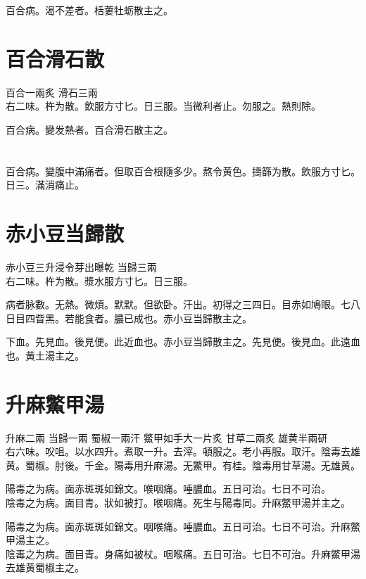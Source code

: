 百合病。渴不差者。栝蔞牡蛎散主之。

\section{百合滑石散}

百合{\scriptsize 一兩炙} 滑石{\scriptsize 三兩}\\
右二味。杵为散。飲服方寸匕。日三服。当微利者止。勿服之。熱則除。

百合病。變发熱者。百合滑石散主之。

\section{}

百合病。變腹中滿痛者。但取百合根隨多少。熬令黄色。擣篩为散。飲服方寸匕。日三。滿消痛止。

\section{赤小豆当歸散}

赤小豆{\scriptsize 三升浸令芽出曝乾} 当歸{\scriptsize 三兩}\\
右二味。杵为散。漿水服方寸匕。日三服。

病者脉數。无熱。微煩。默默。但欲卧。汗出。初得之三四日。目赤如鳩眼。七八日目四眥黑。若能食者。膿已成也。赤{\khaaitp 小}豆当歸散主之。

下血。先見血。後見便。此近血也。赤小豆当歸散主之。先見便。後見血。此遠血也。黄土湯主之。

\section{升麻鱉甲湯}

升麻{\scriptsize 二兩} 当歸{\scriptsize 一兩} 蜀椒{\scriptsize 一兩汗} 鱉甲{\scriptsize 如手大一片炙} 甘草{\scriptsize 二兩炙} 雄黄{\scriptsize 半兩研}\\
右六味。㕮咀。以水四升。煮取一升。去滓。頓服之。老小再服。取汗。陰毒去雄黄。蜀椒。{\scriptsize 肘後。千金。陽毒用升麻湯。无鱉甲。有桂。陰毒用甘草湯。无雄黄。}

陽毒之为病。面赤斑斑如錦文。喉咽痛。唾膿血。五日可治。七日不可治。\\
陰毒之为病。面目青。狀如被打。喉咽痛。死生与陽毒同。升麻鱉甲湯并主之。{\wuben}

陽毒之为病。面赤斑斑如錦文。咽喉痛。唾膿血。五日可治。七日不可治。升麻鱉甲湯主之。\\
陰毒之为病。面目青。身痛如被杖。咽喉痛。五日可治。七日不可治。升麻鱉甲湯去雄黄蜀椒主之。{\dengben}

